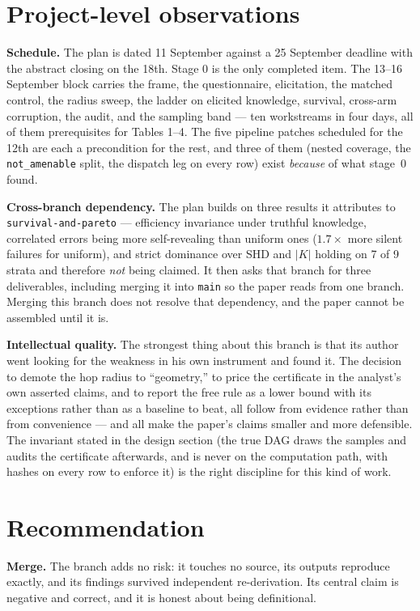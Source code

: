 \documentclass[11pt,a4paper]{article}
\newcommand{\code}[1]{\texttt{\small\hspace{0pt}#1}}
\begin{document}
\section{Project-level observations}

\textbf{Schedule.} The plan is dated 11 September against a 25 September deadline with the
abstract closing on the 18th. Stage 0 is the only completed item. The 13--16 September block
carries the frame, the questionnaire, elicitation, the matched control, the radius sweep, the
ladder on elicited knowledge, survival, cross-arm corruption, the audit, and the sampling band ---
ten workstreams in four days, all of them prerequisites for Tables 1--4. The five pipeline patches
scheduled for the 12th are each a precondition for the rest, and three of them (nested coverage,
the \code{not\_amenable} split, the dispatch leg on every row) exist \emph{because} of what
stage~0 found.

\textbf{Cross-branch dependency.} The plan builds on three results it attributes to
\code{survival-and-pareto} --- efficiency invariance under truthful knowledge, correlated errors
being more self-revealing than uniform ones ($1.7\times$ more silent failures for uniform), and
strict dominance over SHD and $|K|$ holding on 7 of 9 strata and therefore \emph{not} being
claimed. It then asks that branch for three deliverables, including merging it into \code{main} so
the paper reads from one branch. Merging this branch does not resolve that dependency, and the
paper cannot be assembled until it is.

\textbf{Intellectual quality.} The strongest thing about this branch is that its author went
looking for the weakness in his own instrument and found it. The decision to demote the hop radius
to ``geometry,'' to price the certificate in the analyst's own asserted claims, and to report the
free rule as a lower bound with its exceptions rather than as a baseline to beat, all follow from
evidence rather than from convenience --- and all make the paper's claims smaller and more
defensible. The invariant stated in the design section (the true DAG draws the samples and audits
the certificate afterwards, and is never on the computation path, with hashes on every row to
enforce it) is the right discipline for this kind of work.

\section{Recommendation}

\textbf{Merge.} The branch adds no risk: it touches no source, its outputs reproduce exactly, and
its findings survived independent re-derivation. Its central claim is negative and correct, and it
is honest about being definitional.
\end{document}
